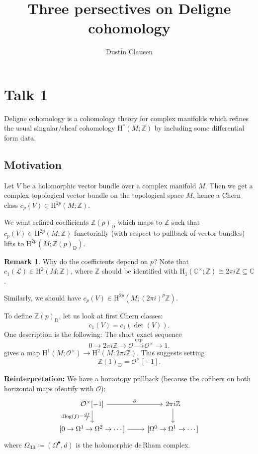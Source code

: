 \documentclass[draft]{amsart}
\newcommand{\ZZ}{\mathbb{Z}}
\newcommand{\CC}{\mathbb{C}}
\renewcommand{\H}{\mathrm{H}}
\newcommand{\D}{\mathrm{D}}
\renewcommand{\O}{\mathcal{O}}
\newcommand{\sheaf}[1]{\mathcal{#1}}
\DeclareMathOperator{\dlog}{dlog}
\theoremstyle{definition}
\newtheorem{rem}[thm]{Remark}
\begin{document}
\title{Three persectives on Deligne cohomology}
\author{Dustin Clausen}
\maketitle
\tableofcontents


\section{Talk 1}

Deligne cohomology is a cohomology theory for complex manifolds which refines the usual singular/sheaf cohomology $\H^*(M;\ZZ)$ by including some differential form data.

\subsection{Motivation}
Let $V$ be a holomorphic vector bundle over a complex manifold $M$. Then we get a complex topological vector bundle on the topological space $M$, hence a Chern class $c_p(V) \in \H^{2p}(M;\ZZ)$.

We want refined coefficients $\ZZ(p)_{\D}$ which maps to $\ZZ$ such that $c_p(V) \in \H^{2p}(M;\ZZ)$ functorially (with respect to pullback of vector bundles) lifts to $\H^{2p}(M; \ZZ(p)_{\D})$.

\begin{rem}
Why do the coefficients depend on $p$? Note that $c_1(\sheaf L) \in \H^{2}(M;\ZZ)$, where $\ZZ$ should be identified with $\H_1(\CC^\times; \ZZ) \cong 2\pi i\ZZ \subseteq \CC$.

Similarly, we should have $c_p(V) \in \H^{2p}(M; (2\pi i)^{p}\ZZ)$.
\end{rem}

To define $\ZZ(p)_{\D}$, let us look at first Chern classes:
\[
c_1(V) = c_1(\det(V)).
\]
One description is the following: The short exact sequence
\[
0\to 2\pi i\ZZ \to \O \xrightarrow{\exp} \O^\times \to 1.
\]
gives a map $\H^1(M;\O^\times) \to \H^2(M;2\pi i\ZZ)$. This suggests setting
\[
\ZZ(1)_{\D} = \O^\times[-1].
\]

\textbf{Reinterpretation:} We have a homotopy pullback (because the cofibers on both horizontal maps identify with $\O$):
\[
\begin{tikzcd}
\O^\times{[-1]} \ar[r,"\partial"] \ar[d,"\dlog(f) = \frac{\mathrm{d} f}{f}"'] & 2\pi i\ZZ \ar[d] \\
{[0\to \Omega^1\to \Omega^2\to\dotsb]} \ar[r] & {[\Omega^0 \to \Omega^1 \to \dotsb]}
\end{tikzcd}
\]
where $\Omega_{\mathrm{dR}} \coloneqq (\Omega^\bullet,d)$ is the holomorphic de\,Rham complex.
\end{document}
